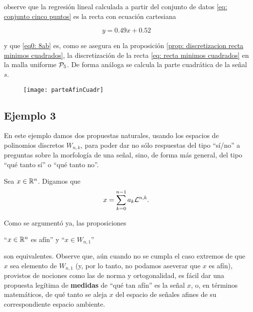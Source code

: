 {observe que 
la regresión lineal calculada a partir
del conjunto de datos
\eqref{eq: conjunto cinco puntos}
es la recta
con ecuación cartesiana

\begin{equation} \label{eq: recta minimos cuadrados}
y=0.49x+0.52
\end{equation}

y que \eqref{eq0: 8ab} es, 
como se asegura en la proposición
\ref{prop: discretizacion recta minimos cuadrados}, la discretización de 
la recta \eqref{eq: recta minimos cuadrados}
en la malla uniforme $\mathcal{P}_{5}$.
De forma análoga se calcula la parte cuadrática de
la señal $s$.

\begin{figure}[H]
	\centering
	\texttt{[image: parteAfinCuadr]}
\end{figure}	


\subsection{Ejemplo 3}
\label{subs: ejm 3}

En este ejemplo 
damos dos propuestas naturales,
usando los espacios de polinomios discretos $W_{n,k}$,
para poder dar no sólo respuestas del tipo
``sí/no'' a preguntas sobre la morfología de una señal, sino,
de forma más general, del tipo ``qué tanto sí'' o
``qué tanto no''.




Sea $x \in \mathbb{R}^{n}$. Digamos que 
\[
x = \sum\limits_{k=0}^{n-1}a_{k} \mathcal{L}^{n, k}.
\]


Como se argumentó ya, las proposiciones
\begin{center}
``$x \in \mathbb{R}^{n}$ es afín'' \hspace{0.2cm} y \hspace{0.2cm} 
``$x \in W_{n,1}$''
\end{center} 
son equivalentes.
Observe que, aún cuando no se cumpla el caso
extremos de que $x$ sea elemento 
de $W_{n,1}$ (y, por lo tanto, no podamos aseverar que
$x$ es afín), provistos
de nociones como las de norma y ortogonalidad, es fácil dar 
una propuesta legítima de
\textbf{medidas} de ``qué tan afín'' es la señal $x$,
o, en términos matemáticos, de qué tanto se aleja
$x$ del espacio de señales afines de su correspondiente
espacio ambiente.

}
